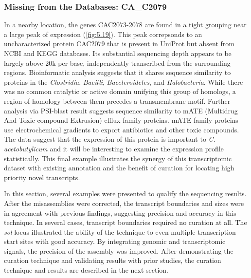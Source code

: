 \subsubsection{Missing from the Databases: CA_C2079}

In a nearby location, the genes CAC2073-2078 are found in a tight grouping near a large peak of expression (\ref{fig:5.19}). This peak correpsonds to an uncharacterized protein CAC2079 that is present in UniProt but absent from NCBI and KEGG databases. Its substantial sequencing depth appears to be largely above 20k per base, independently transcribed from the surrounding regions. Bioinformatic analysis suggests that it shares sequence similarity to proteins in the \textit{Clostridia}, \textit{Bacilli}, \textit{Baceteroidetes}, and \textit{Halobacteria}. While there was no common catalytic or active domain unifying this group of homologs, a region of homology between them precedes a transmembrane motif. Further analysis via PSI-blast result suggests sequence similarity to mATE (Multidrug And Toxic-compound Extrusion) efflux family proteins. mATE family proteins use electrochemical gradients to export antibiotics and other toxic compounds. The data suggest that the expression of this protein is important to \textit{C. acetobutylicum} and it will be interesting to examine the expression profile statistically. This final example illustrates the synergy of this transcriptomic dataset with existing annotation and the benefit of curation for locating high priority novel transcripts.


In this section, several examples were presented to qualify the sequencing results. After the misassemblies were corrected, the transcript boundaries and sizes were in agreement with previous findings, suggesting precision and accuracy in this technique. In several cases, transcript boundaries required no curation at all. The \textit{sol} locus illustrated the ability of the technique to even multiple transcription start sites with good accuracy. By integrating genomic and transcriptomic signals, the precision of the assembly was improved. After demonstrating the curation technique and validating results with prior studies, the curation technique and results are described in the next section.